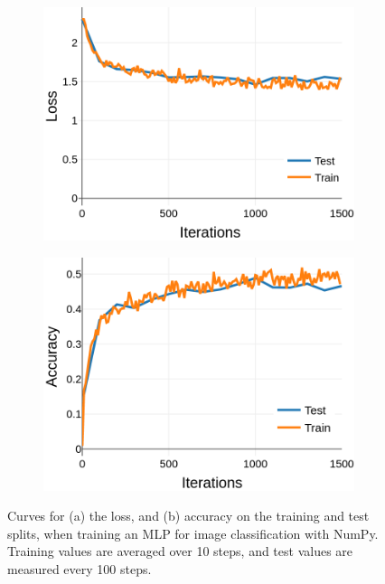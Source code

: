 \documentclass{article}
\begin{document}
\begin{figure}[t]
\begin{subfigure}{0.49\textwidth}
\centering
\includegraphics[scale=0.22]{img/mlp-loss}
\caption{}
\end{subfigure}
\begin{subfigure}{0.49\textwidth}
\centering
\includegraphics[scale=0.22]{img/mlp-acc}
\caption{}
\end{subfigure}
 \caption{Curves for (a) the loss, and (b) accuracy on the training and test splits, when training an MLP for image classification with NumPy. Training values are averaged over 10 steps, and test values are measured every 100 steps.}
\label{fig:mlp_curves}
\end{figure}
\end{document}
